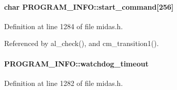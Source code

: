 \paragraph[{start\_\-command}]{\setlength{\rightskip}{0pt plus 5cm}char {\bf PROGRAM\_\-INFO::start\_\-command}\mbox{[}256\mbox{]}}\hfill\label{structPROGRAM__INFO_aae1ebff2f35189c870bfc6634e0f8f12}


Definition at line 1284 of file midas.h.

Referenced by al\_\-check(), and cm\_\-transition1().
\paragraph[{watchdog\_\-timeout}]{ {\bf PROGRAM\_\-INFO::watchdog\_\-timeout}}\hfill\label{structPROGRAM__INFO_a284716de61764b93d49f8be465c186eb}


Definition at line 1282 of file midas.h.